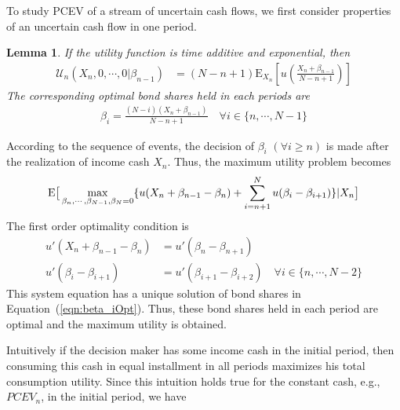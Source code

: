 \documentclass{article}[12pt letter]
\newtheorem{lemma}[theorem]{Lemma}
\newcommand{\E}{\mathrm{E}}
\begin{document}
To study PCEV of a stream of uncertain cash flows,  we first consider properties of an uncertain cash flow in one  period.
\begin{lemma} \label{lem:randomX_n}
If the utility function is time additive and exponential, then
\begin{align}
 \mathcal{U}_n(X_n,0, \cdots, 0|\beta_{n-1}) &=(N-n+1) \E_{X_n} [u(\frac{X_n+\beta_{n-1}}{N-n+1})]
\end{align}
The corresponding optimal bond shares held in each periods are
\begin{align} \label{eqn:beta_iOpt}
\beta_i = \frac{(N-i)(X_n+ \beta_{n-1})}{N-n+1} \quad \forall i \in \{n, \cdots, N-1\}
\end{align}
\end{lemma}
\proof According to the sequence of events, the decision of $\beta_i $ $(\forall i \geq n) $ is made after the realization of income cash $X_n$. Thus,  the maximum utility problem becomes
\begin{align*}
\E\big{[}\max_{\beta_n, \cdots, \beta_{N-1}, \beta_N = 0} \{u(X_n +\beta_{n-1} - \beta_n) + \sum_{i=n+1}^N u(\beta_i - \beta_{i+1})\}|X_n\big{]}
\end{align*}
The first order optimality condition is
\begin{align*}
u'(X_n+\beta_{n-1} - \beta_n) &= u'(\beta_n - \beta_{n+1}) \\
u'(\beta_{i} - \beta_{i+1}) &= u'(\beta_{i+1} - \beta_{i+2}) \quad \forall i \in \{n, \cdots, N-2\}
\end{align*}
This system equation has a unique solution of bond shares in Equation~(\ref{eqn:beta_iOpt}). 
Thus, these bond shares held in each period are optimal and the maximum utility is obtained.
\endproof

Intuitively if the decision maker has some income cash in the initial period, then  consuming this cash in equal installment in all periods maximizes his total consumption utility. Since this intuition holds true for the constant cash, e.g., $PCEV_n$, in the initial period, we have
\end{document}
